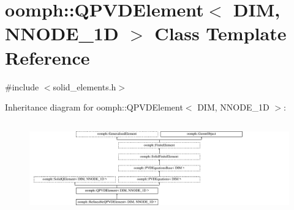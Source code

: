 \hypertarget{classoomph_1_1QPVDElement}{}\section{oomph\+:\+:Q\+P\+V\+D\+Element$<$ D\+IM, N\+N\+O\+D\+E\+\_\+1D $>$ Class Template Reference}
\label{classoomph_1_1QPVDElement}


{\ttfamily \#include $<$solid\+\_\+elements.\+h$>$}

Inheritance diagram for oomph\+:\+:Q\+P\+V\+D\+Element$<$ D\+IM, N\+N\+O\+D\+E\+\_\+1D $>$\+:\begin{figure}[H]
\begin{center}
\leavevmode
\includegraphics[height=3.995923cm]{classoomph_1_1QPVDElement}
\end{center}
\end{figure}
